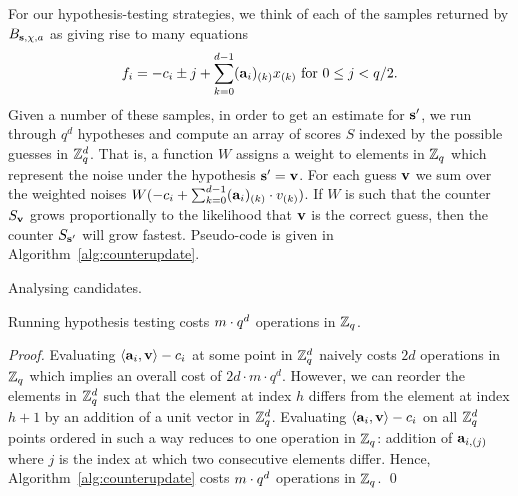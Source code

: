 For our hypothesis-testing strategies, we think of each of the samples returned by $B_{\mathbf{s},\chi,a}$ as giving rise to many equations $$f_i =- c_i \pm j + \sum_{k=0}^{d-1} (\mathbf{a}_i)_{(k)} x_{(k)}  \textnormal{ for } 0 \leq j < q/2.$$ Given a number of these samples, in order to get an estimate for $\mathbf{s'}$, we run through $q^d$ hypotheses and compute an array of scores $S$ indexed by the possible guesses in $\mathbb{Z}_q^d$. That is, a function $W$ assigns a weight to elements in $\mathbb{Z}_q$ which represent the noise under the hypothesis $\mathbf{s}' = \mathbf{v}$. For each guess $\mathbf{v}$ we sum over the weighted noises $W(-c_i + \sum_{k=0}^{d-1}(\mathbf{a}_i)_{(k)}\cdot v_{(k)})$. If $W$ is such that the counter $S_\mathbf{v}$ grows proportionally to the likelihood that $\mathbf{v}$ is the correct guess, then the counter  $S_{\mathbf{s'}}$ will grow fastest. Pseudo-code is given in Algorithm~\ref{alg:counterupdate}.

\begin{algorithm}[H]
\label{alg:counterupdate}
\caption{Analysing candidates.}
\end{algorithm}


\begin{lemma}
\label{lem:counterupdate}
Running hypothesis testing costs ${m \cdot q^d}$ operations in $\mathbb{Z}_q$.
\end{lemma}

\begin{proof}
Evaluating $\dotp{\avec_i}{\vvec} - c_i$ at some point in $\mathbb{Z}_q^d$ naively costs $2d$ operations in $\mathbb{Z}_q$ which implies an overall cost of $2d\cdot m\cdot q^d$. However, we can reorder the elements in $\mathbb{Z}_q^d$ such that the element at index $h$ differs from the element at index $h+1$ by an addition of a unit vector in $\mathbb{Z}_q^d$. Evaluating $\dotp{\avec_i}{\vvec} - c_i$ on all $\mathbb{Z}_q^d$ points ordered in such a way reduces to one operation in $\mathbb{Z}_q$:  addition of $\mathbf{a}_{i,(j)}$ where $j$ is the index at which two consecutive elements differ. Hence, Algorithm~\ref{alg:counterupdate} costs ${m \cdot q^d}$ operations in $\mathbb{Z}_q$. \qed
\end{proof}


